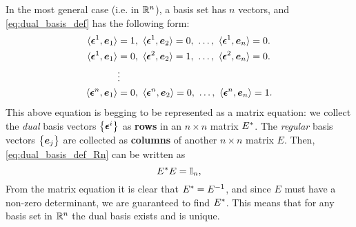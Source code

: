 In the most general case (i.e. in $\Rs[n]$), a basis set has $n$ vectors, and \autoref{eq:dual_basis_def} has the following form:
\begin{equation}
    \begin{aligned}
        \inner{\dualeb{1}}{\eb{1}} &= 1,\ \inner{\dualeb{1}}{\eb{2}} = 0,\ \dots,\ \inner{\dualeb{1}}{\eb{n}} = 0.\\
        \inner{\dualeb{1}}{\eb{1}} &= 0,\ \inner{\dualeb{2}}{\eb{2}} = 1,\ \dots,\ \inner{\dualeb{2}}{\eb{n}} = 0.\\
                                   &\vdots\\
        \inner{\dualeb{n}}{\eb{1}} &= 0,\ \inner{\dualeb{n}}{\eb{2}} = 0,\ \dots,\ \inner{\dualeb{n}}{\eb{n}} = 1.\\
    \end{aligned}
    \label{eq:dual_basis_def_Rn}
\end{equation}
This above equation is begging to be represented as a matrix equation: we collect the \textit{dual} basis vectors $\left\{\dualeb{i}\right\}$ as \textbf{rows} in an $n\times n$ matrix $\dualbasis{E}$. The \textit{regular} basis vectors $\left\{\eb{j}\right\}$ are collected as \textbf{columns} of another $n\times n$ matrix $E$. Then, \autoref{eq:dual_basis_def_Rn} can be written as
\begin{equation}
    \dualbasis{E}E = \Id{n},
    \label{eq:dual_basis_matrix}
\end{equation}
From the matrix equation it is clear that $\dualbasis{E}=E^{-1}$, and since $E$ must have a non-zero determinant, we are guaranteed to find $\dualbasis{E}$. This means that for any basis set in $\Rs[n]$ the dual basis exists and is unique.

